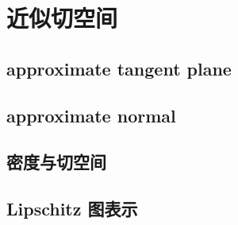 \section{近似切空间}
\label{b1:sec:1902}


\subsection{approximate tangent plane}
\label{b1:subsec:190201}

\subsection{approximate normal}
\label{b1:subsec:190202}

\subsection{密度与切空间}
\label{b1:subsec:190203}

\subsection{Lipschitz 图表示}
\label{b1:subsec:190204}


